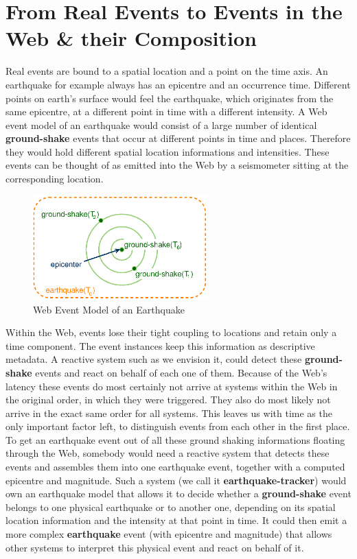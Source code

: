 \section{From Real Events to Events in the Web \& their Composition}
Real events are bound to a spatial location and a point on the time axis.
An earthquake for example always has an epicentre and an occurrence time.
Different points on earth's surface would feel the earthquake, which originates from the same epicentre, at a different point in time with a different intensity.
A Web event model of an earthquake would consist of a large number of identical \textrm{\textbf{ground-shake}} events that occur at different points in time and places.
Therefore they would hold different spatial location informations and intensities.
These events can be thought of as emitted into the Web by a seismometer sitting at the corresponding location.
\begin{figure}[!ht]
  \centering
  \includegraphics[width=0.6\textwidth]{figures/Earthquake}
  \caption{Web Event Model of an Earthquake}
  \label{fig:Earthquake}
\end{figure}
Within the Web, events lose their tight coupling to locations and retain only a time component.
The event instances keep this information as descriptive metadata.
A reactive system such as we envision it, could detect these \textrm{\textbf{ground-shake}} events and react on behalf of each one of them.
Because of the Web's latency these events do most certainly not arrive at systems within the Web in the original order, in which they were triggered.
They also do most likely not arrive in the exact same order for all systems.
This leaves us with time as the only important factor left, to distinguish events from each other in the first place.
To get an earthquake event out of all these ground shaking informations floating through the Web, somebody would need a reactive system that detects these events and assembles them into one earthquake event, together with a computed epicentre and magnitude.
Such a system (we call it \textrm{\textbf{earthquake-tracker}}) would own an earthquake model that allows it to decide whether a \textrm{\textbf{ground-shake}} event belongs to one physical earthquake or to another one, depending on its spatial location information and the intensity at that point in time.
It could then emit a more complex \textrm{\textbf{earthquake}} event (with epicentre and magnitude) that allows other systems to interpret this physical event and react on behalf of it.

